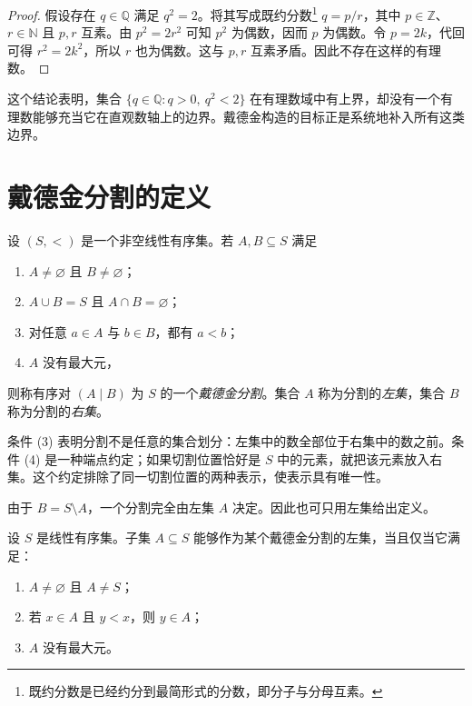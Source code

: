 \documentclass[UTF8,12pt,a4paper,fontset=fandol]{ctexbook}
\begin{document}
\begin{proof}
假设存在 $q\in\mathbb{Q}$ 满足 $q^2=2$。将其写成既约分数\footnote{既约分数是已经约分到最简形式的分数，即分子与分母互素。} $q=p/r$，其中 $p\in\mathbb{Z}$、$r\in\mathbb{N}$ 且 $p,r$ 互素。由 $p^2=2r^2$ 可知 $p^2$ 为偶数，因而 $p$ 为偶数。令 $p=2k$，代回可得 $r^2=2k^2$，所以 $r$ 也为偶数。这与 $p,r$ 互素矛盾。因此不存在这样的有理数。
\end{proof}

这个结论表明，集合 $\{q\in\mathbb{Q}:q>0,\ q^2<2\}$ 在有理数域中有上界，却没有一个有理数能够充当它在直观数轴上的边界。戴德金构造的目标正是系统地补入所有这类边界。

\section{戴德金分割的定义}

\begin{definition}[戴德金分割]
设 $(S,<)$ 是一个非空线性有序集。若 $A,B\subseteq S$ 满足
\begin{enumerate}[label=(\arabic*)]
  \item $A\ne\varnothing$ 且 $B\ne\varnothing$；
  \item $A\cup B=S$ 且 $A\cap B=\varnothing$；
  \item 对任意 $a\in A$ 与 $b\in B$，都有 $a<b$；
  \item $A$ 没有最大元，
\end{enumerate}
则称有序对 $(A\mid B)$ 为 $S$ 的一个\emph{戴德金分割}。集合 $A$ 称为分割的\emph{左集}，集合 $B$ 称为分割的\emph{右集}。
\end{definition}

条件 (3) 表明分割不是任意的集合划分：左集中的数全部位于右集中的数之前。条件 (4) 是一种端点约定；如果切割位置恰好是 $S$ 中的元素，就把该元素放入右集。这个约定排除了同一切割位置的两种表示，使表示具有唯一性。

由于 $B=S\setminus A$，一个分割完全由左集 $A$ 决定。因此也可只用左集给出定义。

\begin{proposition}[左集形式]
设 $S$ 是线性有序集。子集 $A\subseteq S$ 能够作为某个戴德金分割的左集，当且仅当它满足：
\begin{enumerate}[label=(\arabic*)]
  \item $A\ne\varnothing$ 且 $A\ne S$；
  \item 若 $x\in A$ 且 $y<x$，则 $y\in A$；
  \item $A$ 没有最大元。
\end{enumerate}
\end{proposition}
\end{document}
